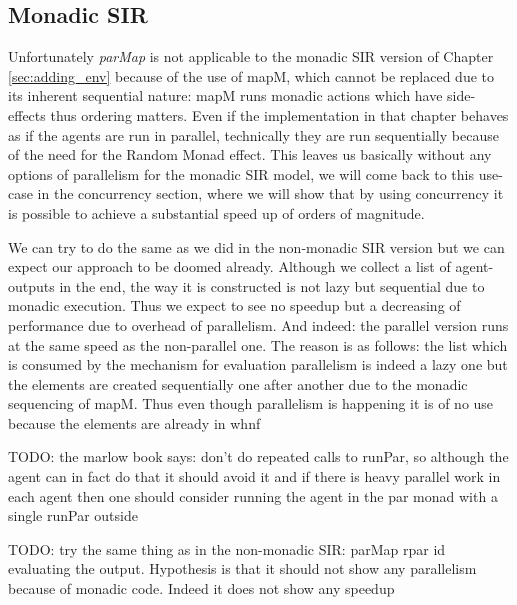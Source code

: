 \subsection{Monadic SIR}
Unfortunately \textit{parMap} is not applicable to the monadic SIR version of Chapter \ref{sec:adding_env} because of the use of mapM, which cannot be replaced due to its inherent sequential nature: mapM runs monadic actions which have side-effects thus ordering matters. Even if the implementation in that chapter behaves as if the agents are run in parallel, technically they are run sequentially because of the need for the Random Monad effect. This leaves us basically without any options of parallelism for the monadic SIR model, we will come back to this use-case in the concurrency section, where we will show that by using concurrency it is possible to achieve a substantial speed up of orders of magnitude.

We can try to do the same as we did in the non-monadic SIR version but we can expect our approach to be doomed already. Although we collect a list of agent-outputs in the end, the way it is constructed is not lazy but sequential due to monadic execution. Thus we expect to see no speedup but a decreasing of performance due to overhead of parallelism. And indeed: the parallel version runs at the same speed as the non-parallel one. The reason is as follows: the list which is consumed by the mechanism for evaluation parallelism is indeed a lazy one but the elements are created sequentially one after another due to the monadic sequencing of mapM. 
Thus even though parallelism is happening it is of no use because the elements are already in whnf

TODO: the marlow book says: don't do repeated calls to runPar, so although the agent can in fact do that it should avoid it and if there is heavy parallel work in each agent then one should consider running the agent in the par monad with a single runPar outside



TODO: try the same thing as in the non-monadic SIR: parMap rpar id evaluating the output. Hypothesis is that it should not show any parallelism because of monadic code. Indeed it does not show any speedup
